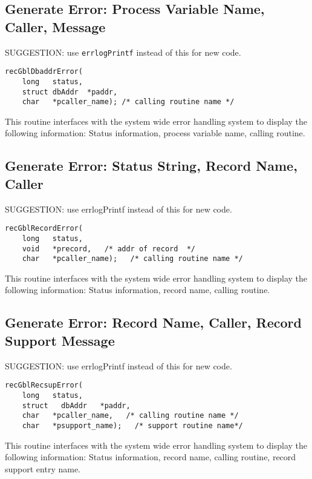 \subsection{Generate Error: Process Variable Name, Caller, Message}

SUGGESTION: use \verb|errlogPrintf| instead of this for new code.

\begin{verbatim}
recGblDbaddrError(
    long   status,
    struct dbAddr  *paddr,
    char   *pcaller_name); /* calling routine name */
\end{verbatim}

This routine interfaces with the system wide error handling system to display the following information: Status 
information, process variable name, calling routine.

\subsection{Generate Error: Status String, Record Name, Caller}
SUGGESTION: use errlogPrintf instead of this for new code.
\begin{verbatim}
recGblRecordError(
    long   status,
    void   *precord,   /* addr of record  */
    char   *pcaller_name);   /* calling routine name */
\end{verbatim}

This routine interfaces with the system wide error handling system to display the following information: Status 
information, record name, calling routine.

\subsection{Generate Error: Record Name, Caller, Record Support Message}
SUGGESTION: use errlogPrintf instead of this for new code.
\begin{verbatim}
recGblRecsupError(
    long   status,
    struct   dbAddr   *paddr,
    char   *pcaller_name,   /* calling routine name */
    char   *psupport_name);   /* support routine name*/
\end{verbatim}

This routine interfaces with the system wide error handling system to display the following information: Status 
information, record name, calling routine, record support entry name.

